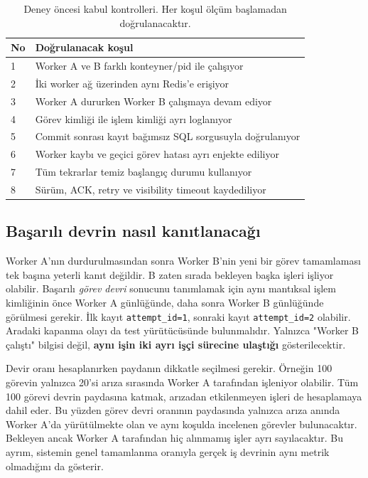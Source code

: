 \documentclass[conference,a4paper]{IEEEtran}
\newcommand{\code}[1]{\texttt{#1}}
\begin{document}
\begin{table}[t]
\caption{Deney öncesi kabul kontrolleri. Her koşul ölçüm başlamadan doğrulanacaktır.}
\centering\footnotesize
\begin{tabularx}{\columnwidth}{@{}p{8mm}X@{}}
\toprule
No & Doğrulanacak koşul\\
\midrule
1 & Worker A ve B farklı konteyner/pid ile çalışıyor\\
2 & İki worker ağ üzerinden aynı Redis'e erişiyor\\
3 & Worker A dururken Worker B çalışmaya devam ediyor\\
4 & Görev kimliği ile işlem kimliği ayrı loglanıyor\\
5 & Commit sonrası kayıt bağımsız SQL sorgusuyla doğrulanıyor\\
6 & Worker kaybı ve geçici görev hatası ayrı enjekte ediliyor\\
7 & Tüm tekrarlar temiz başlangıç durumu kullanıyor\\
8 & Sürüm, ACK, retry ve visibility timeout kaydediliyor\\
\bottomrule
\end{tabularx}
\label{tab:acceptance}
\end{table}


\subsection{Başarılı devrin nasıl kanıtlanacağı}
Worker A'nın durdurulmasından sonra Worker B'nin yeni bir görev tamamlaması tek başına yeterli kanıt değildir. B zaten sırada bekleyen başka işleri işliyor olabilir. Başarılı \emph{görev devri} sonucunu tanımlamak için aynı mantıksal işlem kimliğinin önce Worker A günlüğünde, daha sonra Worker B günlüğünde görülmesi gerekir. İlk kayıt \code{attempt\_id=1}, sonraki kayıt \code{attempt\_id=2} olabilir. Aradaki kapanma olayı da test yürütücüsünde bulunmalıdır. Yalnızca "Worker B çalıştı" bilgisi değil, \textbf{aynı işin iki ayrı işçi sürecine ulaştığı} gösterilecektir.

Devir oranı hesaplanırken paydanın dikkatle seçilmesi gerekir. Örneğin 100 görevin yalnızca 20'si arıza sırasında Worker A tarafından işleniyor olabilir. Tüm 100 görevi devrin paydasına katmak, arızadan etkilenmeyen işleri de hesaplamaya dahil eder. Bu yüzden görev devri oranının paydasında yalnızca arıza anında Worker A'da yürütülmekte olan ve aynı koşulda incelenen görevler bulunacaktır. Bekleyen ancak Worker A tarafından hiç alınmamış işler ayrı sayılacaktır. Bu ayrım, sistemin genel tamamlanma oranıyla gerçek iş devrinin aynı metrik olmadığını da gösterir.
\end{document}
